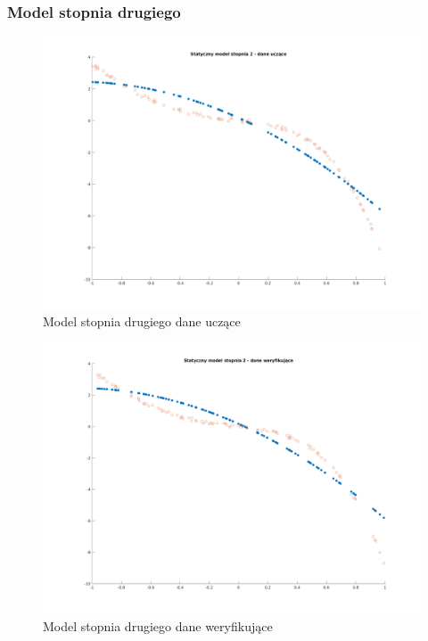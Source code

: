\documentclass[a4paper, 11pt]{article}
\begin{document}
\subsubsection{Model stopnia drugiego}
\begin{figure}[H]
\centering
\includegraphics[scale=0.50]{dane_stat_2_ucz.png}
\caption{Model stopnia drugiego dane uczące}
\label{}
\end{figure}
\begin{figure}[H]
\centering
\includegraphics[scale=0.50]{dane_stat_2_wer.png}
\caption{Model stopnia drugiego dane weryfikujące}
\label{}
\end{figure}
\end{document}
